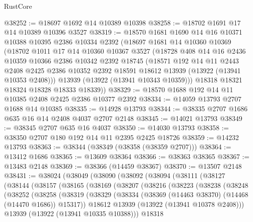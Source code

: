 \begin{lexlean}{RustCore}
\begin{coremodule}
@38252 := @18697 @1692 @14 @10389 @10398
@38258 := @18702 @1691 @17 @14 @10389 @10396 @3527
@38319 := @18570
    @1681
    @1690
    @14
    @16
    @10371
    @10388
    @10395
    @2386
    @10334
    @2392
    (@18697
      @1681
      @14
      @10360
      @10369
      (@18702
        @1011
        @17
        @14
        @10360
        @10367
        @3527
        (@18728
          @408
          @14
          @16
          @2436
          @10359
          @10366
          @2386
          @10342
          @2392
          @18745
          (@18571
            @192
            @14
            @11
            @2443
            @2408
            @2425
            @2386
            @10352
            @2392
            @18591
            @18612
            @13939
            (@13922 (@13941 @10353 @2408)))
          @13939
          (@13922 (@13941 @10343 @10359)))
        @18318
        @18321
        @18324
        @18328
        @18333
        @18339))
@38329 := @18570 @1688 @192 @14 @11 @10385 @2408 @2425 @2386 @10377 @2392
@38334 := @14059 @13793 @2707 @1688 @14 @10385
@38335 := @14928 @13793
@38344 := @38335 @2707 @1686 @635 @16 @14 @2408 @4037 @2707 @2148
@38345 := @14021 @13793
@38349 := @38345 @2707 @635 @16 @4037
@38350 := @14030 @13793
@38358 := @38350 @2707 @180 @192 @14 @11 @2395 @2425 @18726
@38359 := @14232 @13793
@38363 := @38344 (@38349 (@38358 (@38359 @2707)))
@38364 := @13412 @1686
@38365 := @13609 @38364
@38366 := @38363 @38365
@38367 := @13483 @2148
@38369 := @38366 (@14459 @38367)
@38370 := @13507 @2148
@38431 := @38024
    (@38049
      (@38090
        (@38092
          (@38094
            (@38111
              (@38127
                (@38144
                  (@38157
                    (@38165
                      (@38169
                        (@38207
                          (@38216
                            (@38223
                              (@38238
                                (@38248
                                  (@38252
                                    (@38258
                                      (@38319
                                        (@38329
                                          (@38334
                                            (@38369 (@14463 @38370) (@14468 (@14470 @1686)) @15317))
                                          @18612
                                          @13939
                                          (@13922 (@13941 @10378 @2408)))
                                        @13939
                                        (@13922 (@13941 @10335 @10388)))
                                      @18318

\end{coremodule}
\end{lexlean}
